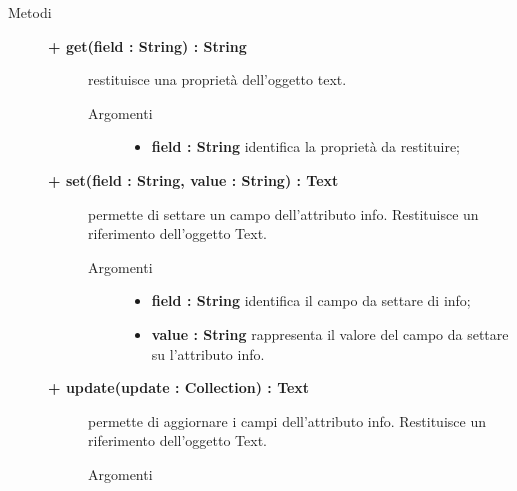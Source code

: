 \begin{description}
\item[Metodi] \hfill

\begin{description}
		\item[\textbf{\color{blue}+ get(field : String) : String			}] \hfill
			restituisce una proprietà dell'oggetto text.
			
		\begin{description}
			\item[Argomenti] \hfill
				\begin{itemize}
				
					\item \textbf{field : String			} \hfill
					identifica la proprietà da restituire;
				\end{itemize}
		\end{description}

\end{description}


		\begin{description}
		\item[\textbf{\color{blue}+ set(field : String, value : String) : Text			}] \hfill
			permette di settare un campo dell'attributo info. Restituisce un riferimento dell'oggetto Text.
			
		\begin{description}
			\item[Argomenti] \hfill
				\begin{itemize}
				
					\item \textbf{field : String			} \hfill
					identifica il campo da settare di info;
					\item \textbf{value : String			} \hfill
					rappresenta il valore del campo da settare su l'attributo info.
				\end{itemize}
		\end{description}

\end{description}

\begin{description}
		\item[\textbf{\color{blue}+ update(update : Collection) : Text			}] \hfill
			permette di aggiornare i campi dell'attributo info. Restituisce un riferimento dell'oggetto Text.
			
		\begin{description}
			\item[Argomenti] \hfill
				\begin{itemize}
				

\end{itemize}
\end{description}
\end{description}
\end{description}
